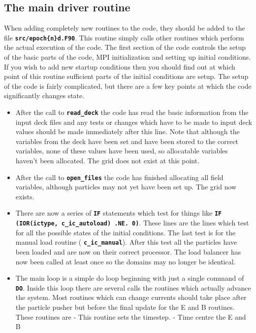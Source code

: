\documentclass[12pt,a4paper]{article}
\newcommand{\inlinecode}[1]{{\color{warwickred} \bf\texttt{#1}}}
\begin{document}
\subsection{The main driver routine}
When adding completely new routines to the code, they should be added to the
file \inlinecode{src/epoch\{n\}d.F90}. This routine simply calls other routines
which perform the actual execution of the code. The first section of the code
controls the setup of the basic parts of the code, MPI initialization and
setting up initial conditions. If you wish to add new startup conditions then
you should find out at which point of this routine sufficient parts of the
initial conditions are setup. The setup of the code is fairly complicated, but
there are a few key points at which the code significantly changes state.
\begin{itemize}
\item After the call to \inlinecode{read\_deck} the code has read the basic
  information from the input deck files and any tests or changes which have to
  be made to input deck values should be made immediately after this line. Note
  that although the variables from the deck have been set and have been stored
  to the correct variables, none of these values have been used, so allocatable
  variables haven't been allocated. The grid does not exist at this point.
\item After the call to \inlinecode{open\_files} the code has finished
  allocating all field variables, although particles may not yet have been set
  up. The grid now exists.
\item There are now a series of \inlinecode{IF} statements which test for
  things like \inlinecode{IF (IOR(ictype, c\_ic\_autoload) .NE. 0)}. These lines
  are the lines which test for all the possible states of the initial
  conditions. The last test is for the manual load routine
  (\inlinecode{c\_ic\_manual}). After this test all the particles have been
  loaded and are now on their correct processor. The load balancer has now been
  called at least once so the domains may no longer be identical.
\item The main loop is a simple do loop beginning with just a single command of
  \inlinecode{DO}. Inside this loop there are several calls the routines which
  actually advance the system. Most routines which can change currents should
  take place after the particle pusher but before the final update for the E
  and B routines. These routines are
  \subitem \inlinecode{set\_dt} - This routine sets the timestep.
  \subitem \inlinecode{update\_eb\_fields\_half} - Time centre the E and B

\end{itemize}
\end{document}
